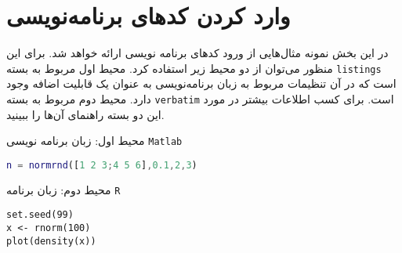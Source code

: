 
\chapter{وارد کردن کدهای برنامه‌نویسی}\label{App:Programming Code}
\thispagestyle{empty}

در این بخش نمونه مثال‌هایی از ورود کدهای برنامه نویسی ارائه خواهد شد. برای این منظور می‌توان از دو محیط زیر استفاده کرد. محیط اول مربوط به بسته 
\verb|listings|
 است که در آن تنظیمات مربوط به زبان برنامه‌نویسی به عنوان یک قابلیت اضافه وجود دارد. محیط دوم مربوط به بسته 
 \verb|verbatim|
 است. برای کسب اطلاعات بیشتر در مورد این دو بسته راهنمای آن‌ها را ببینید.
 
 محیط اول: زبان برنامه نویسی 
 \verb|Matlab|
\begin{latin}
\begin{lstlisting}[language=Matlab]
n = normrnd([1 2 3;4 5 6],0.1,2,3)
\end{lstlisting}
\end{latin}

محیط دوم: زبان برنامه 
 \verb|R|
 
 \begin{latin}
 \begin{verbatim}
set.seed(99)
x <- rnorm(100)
plot(density(x))
\end{verbatim}
 \end{latin}
 